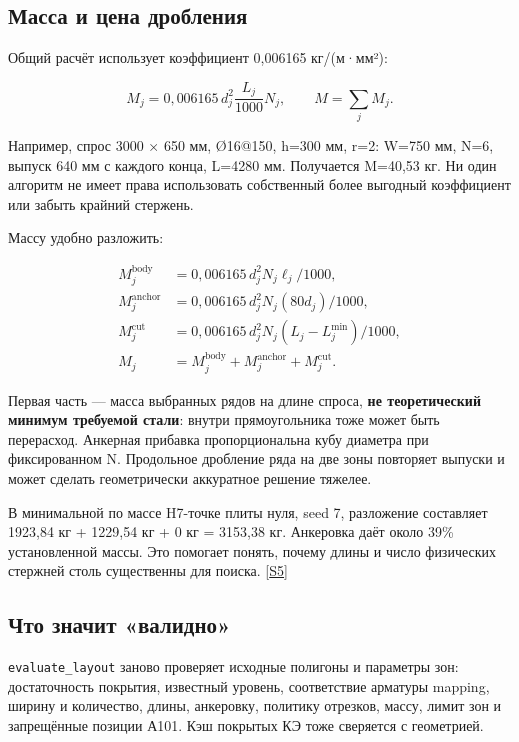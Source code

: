 \documentclass[11pt,a4paper]{article}
\begin{document}
\subsection{Масса и цена дробления}

Общий расчёт использует коэффициент 0,006165 кг/(м·мм²):


\[
M_j=0{,}006165\,d_j^2\frac{L_j}{1000}N_j,
\qquad M=\sum_j M_j.
\]

Например, спрос 3000 × 650 мм, Ø16@150, h=300 мм, r=2: W=750 мм, N=6, выпуск 640 мм с каждого конца, L=4280 мм. Получается M=40,53 кг. Ни один алгоритм не имеет права использовать собственный более выгодный коэффициент или забыть крайний стержень.


Массу удобно разложить:


\[
\begin{aligned}
M_j^{\mathrm{body}}&=0{,}006165\,d_j^2N_j\ell_j/1000,\\
M_j^{\mathrm{anchor}}&=0{,}006165\,d_j^2N_j(80d_j)/1000,\\
M_j^{\mathrm{cut}}&=0{,}006165\,d_j^2N_j(L_j-L_j^{\min})/1000,\\
M_j&=M_j^{\mathrm{body}}+M_j^{\mathrm{anchor}}+M_j^{\mathrm{cut}}.
\end{aligned}
\]

Первая часть — масса выбранных рядов на длине спроса, \textbf{не теоретический минимум требуемой стали}: внутри прямоугольника тоже может быть перерасход. Анкерная прибавка пропорциональна кубу диаметра при фиксированном N. Продольное дробление ряда на две зоны повторяет выпуски и может сделать геометрически аккуратное решение тяжелее.


В минимальной по массе H7-точке плиты нуля, seed 7, разложение составляет 1923,84 кг + 1229,54 кг + 0 кг = 3153,38 кг. Анкеровка даёт около 39\% установленной массы. Это помогает понять, почему длины и число физических стержней столь существенны для поиска. {\color{Teal}\small[\hyperlink{S5}{S5}]}


\subsection{Что значит «валидно»}

{\small\nolinkurl{evaluate_layout}} заново проверяет исходные полигоны и параметры зон: достаточность покрытия, известный уровень, соответствие арматуры mapping, ширину и количество, длины, анкеровку, политику отрезков, массу, лимит зон и запрещённые позиции А101. Кэш покрытых КЭ тоже сверяется с геометрией.
\end{document}
